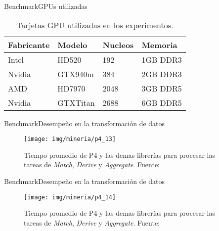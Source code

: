 \documentclass[10pt]{beamer}
\newcommand{\1}{
	\setbeamertemplate{background}{
		\texttt{[image: img/1]}
		\tikz[overlay] \fill[fill opacity=0.75,fill=white] (0,0) rectangle (-\paperwidth,\paperheight);
	}
}
\begin{document}
\begin{frame}{Benchmark}{GPUs utilizadas}
\begin{table}[]
	\caption{Tarjetas GPU utilizadas en los experimentos.}
	\begin{tabular}{llll}
		\hline
		Fabricante  & Modelo & Nucleos & Memoria \\ \hline
		Intel &  HD520 & 192 & 1GB DDR3 \\
		Nvidia  &  GTX940m & 384 & 2GB DDR3 \\
		AMD  &  HD7970 & 2048 & 3GB DDR5 \\
		Nvidia &  GTXTitan & 2688 & 6GB DDR5 \\
	\end{tabular}
\end{table}
\end{frame}

\begin{frame}{Benchmark}{Desempeño en la transformación de datos}
	\begin{figure}[]
		\centering
		\texttt{[image: img/mineria/p4\_13]}
		\caption{Tiempo promedio de P4 y las demas librerías para procesar las tareas de \textit{Match}, \textit{Derive} y \textit{Aggregate}. Fuente: \cite{li2018p4}}
	\end{figure}
\end{frame}

\begin{frame}{Benchmark}{Desempeño en la transformación de datos}
	\begin{figure}[]
		\centering
		\texttt{[image: img/mineria/p4\_14]}
		\caption{Tiempo promedio de P4 y las demas librerías para procesar las tareas de \textit{Match}, \textit{Derive} y \textit{Aggregate}. Fuente: \cite{li2018p4}}
	\end{figure}
\end{frame}
\end{document}
